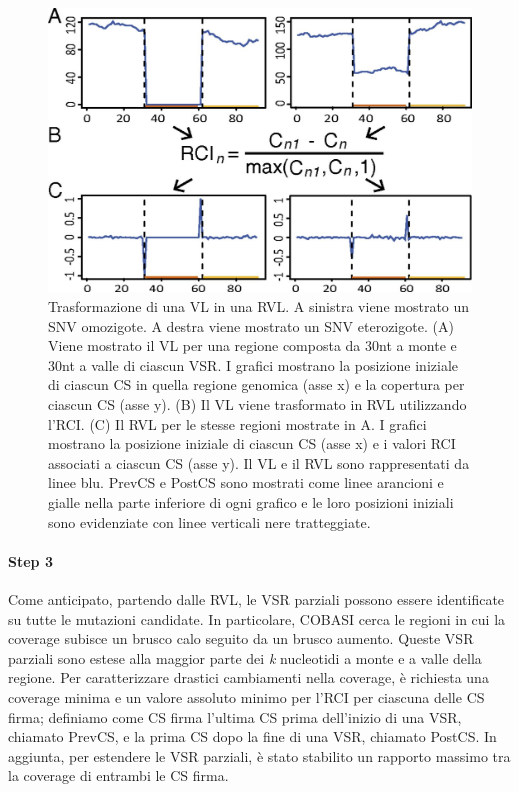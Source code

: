 \documentclass[../main.tex]{subfiles}
\begin{document}
\begin{figure}[ht!]
	\centering
  	\captionsetup{justification=justified}
  	\includegraphics[scale=.80]{../images/cobasi_rci.jpg}
  	\caption{Trasformazione di una VL in una RVL. A sinistra viene mostrato un SNV omozigote. A destra viene mostrato un SNV eterozigote. (A) Viene mostrato il VL per una regione composta da 30nt a monte e 30nt a valle di ciascun VSR. I grafici mostrano la posizione iniziale di ciascun CS in quella regione genomica (asse x) e la copertura per ciascun CS (asse y). (B) Il VL viene trasformato in RVL utilizzando l'RCI. (C)  Il RVL per le stesse regioni mostrate in A. I grafici mostrano la posizione iniziale di ciascun CS (asse x) e i valori RCI associati a ciascun CS (asse y). Il VL e il RVL sono rappresentati da linee blu. PrevCS e PostCS sono mostrati come linee arancioni e gialle nella parte inferiore di ogni grafico e le loro posizioni iniziali sono evidenziate con linee verticali nere tratteggiate. }
  	\label{fig:cobasi_rci}
\end{figure}

\paragraph{Step 3} Come anticipato, partendo dalle RVL, le VSR parziali possono essere identificate su tutte le mutazioni candidate. In particolare, COBASI cerca le regioni in cui la coverage subisce un brusco calo seguito da un brusco aumento. Queste VSR parziali sono estese alla maggior parte dei \textit{k} nucleotidi a monte e a valle della regione. Per caratterizzare drastici cambiamenti nella coverage, è richiesta una coverage minima e un valore assoluto minimo per l'RCI per ciascuna delle CS firma; definiamo come CS firma l'ultima CS prima dell'inizio di una VSR, chiamato PrevCS, e la prima CS dopo la fine di una VSR, chiamato  PostCS. In aggiunta, per estendere le VSR parziali, è stato stabilito un rapporto massimo tra la coverage di entrambi le CS firma. 
\end{document}
